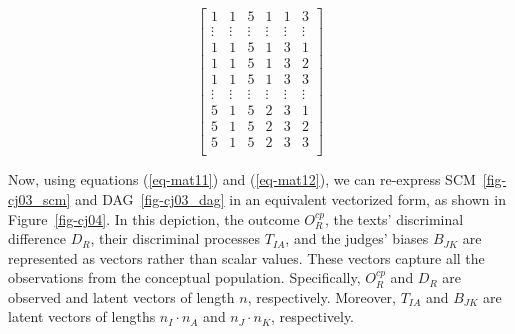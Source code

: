 \documentclass[
  authoryear,
  review,
  1p]{elsarticle}
\begin{document}
\begin{equation}
{\begin{bmatrix}
1 & 1 & 5 & 1 & 1 & 3 \\
\vdots & \vdots & \vdots & \vdots & \vdots & \vdots\\
1 & 1 & 5 & 1 & 3 & 1 \\
1 & 1 & 5 & 1 & 3 & 2 \\
1 & 1 & 5 & 1 & 3 & 3 \\
\vdots & \vdots & \vdots & \vdots & \vdots & \vdots\\
5 & 1 & 5 & 2 & 3 & 1 \\
5 & 1 & 5 & 2 & 3 & 2 \\
5 & 1 & 5 & 2 & 3 & 3 \\
\end{bmatrix}
}\end{equation}

Now, using equations (\ref{eq-mat11}) and (\ref{eq-mat12}), we can
re-express SCM~\ref{fig-cj03_scm} and DAG~\ref{fig-cj03_dag} in an
equivalent vectorized form, as shown in Figure~\ref{fig-cj04}. In this
depiction, the outcome \(O^{cp}_{R}\), the texts' discriminal difference
\(D_{R}\), their discriminal processes \(T_{IA}\), and the judges'
biases \(B_{JK}\) are represented as vectors rather than scalar values.
These vectors capture all the observations from the conceptual
population. Specifically, \(O^{cp}_{R}\) and \(D_{R}\) are observed and
latent vectors of length \(n\), respectively. Moreover, \(T_{IA}\) and
\(B_{JK}\) are latent vectors of lengths \(n_{I} \cdot n_{A}\) and
\(n_{J} \cdot n_{K}\), respectively.
\end{document}
